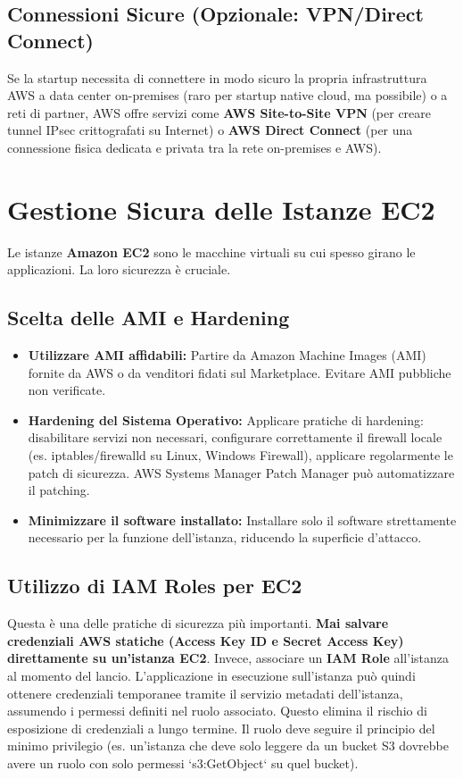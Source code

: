 \documentclass[a4paper,12pt]{report}
\begin{document}
\subsection{Connessioni Sicure (Opzionale: VPN/Direct Connect)}
\label{subsec:vpn-directconnect}
Se la startup necessita di connettere in modo sicuro la propria infrastruttura AWS a data center on-premises (raro per startup native cloud, ma possibile) o a reti di partner, AWS offre servizi come \textbf{AWS Site-to-Site VPN} (per creare tunnel IPsec crittografati su Internet) o \textbf{AWS Direct Connect} (per una connessione fisica dedicata e privata tra la rete on-premises e AWS).

\section{Gestione Sicura delle Istanze EC2}
\label{sec:ec2-security}
Le istanze \textbf{Amazon EC2} sono le macchine virtuali su cui spesso girano le applicazioni. La loro sicurezza è cruciale.

\subsection{Scelta delle AMI e Hardening}
\label{subsec:ami-hardening}
\begin{itemize}
    \item \textbf{Utilizzare AMI affidabili:} Partire da Amazon Machine Images (AMI) fornite da AWS o da venditori fidati sul Marketplace. Evitare AMI pubbliche non verificate.
    \item \textbf{Hardening del Sistema Operativo:} Applicare pratiche di hardening: disabilitare servizi non necessari, configurare correttamente il firewall locale (es. iptables/firewalld su Linux, Windows Firewall), applicare regolarmente le patch di sicurezza. AWS Systems Manager Patch Manager può automatizzare il patching.
    \item \textbf{Minimizzare il software installato:} Installare solo il software strettamente necessario per la funzione dell'istanza, riducendo la superficie d'attacco.
\end{itemize}

\subsection{Utilizzo di IAM Roles per EC2}
\label{subsec:iam-roles-ec2}
Questa è una delle pratiche di sicurezza più importanti. \textbf{Mai salvare credenziali AWS statiche (Access Key ID e Secret Access Key) direttamente su un'istanza EC2}. Invece, associare un \textbf{IAM Role} all'istanza al momento del lancio. L'applicazione in esecuzione sull'istanza può quindi ottenere credenziali temporanee tramite il servizio metadati dell'istanza, assumendo i permessi definiti nel ruolo associato. Questo elimina il rischio di esposizione di credenziali a lungo termine. Il ruolo deve seguire il principio del minimo privilegio (es. un'istanza che deve solo leggere da un bucket S3 dovrebbe avere un ruolo con solo permessi `s3:GetObject` su quel bucket).
\end{document}
